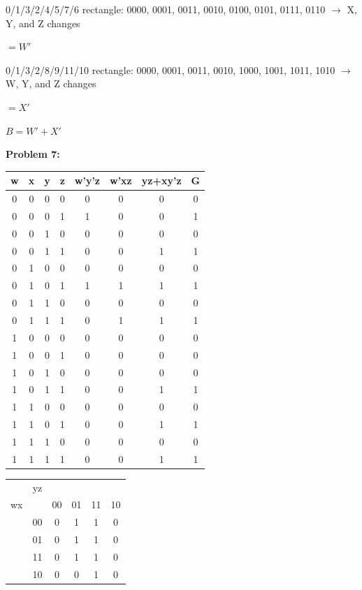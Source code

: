 \documentclass{article}
\begin{document}
    0/1/3/2/4/5/7/6 rectangle: 0000, 0001, 0011, 0010, 0100, 0101, 0111, 0110
    $\rightarrow$ X, Y, and Z changes

    \quad $=W'$

    0/1/3/2/8/9/11/10 rectangle: 0000, 0001, 0011, 0010, 1000, 1001, 1011, 1010
    $\rightarrow$ W, Y, and Z changes

    \quad $=X'$

    $\boxed{B = W'+X'}$


    \textbf{Problem 7:}

    \begin{center}
        \begin{tabular} {ccccccc|c}
            w & x & y & z & w'y'z & w'xz & yz+xy'z & G \\
            \hline
            0 & 0 & 0 & 0 & 0& 0& 0& 0 \\
            0 & 0 & 0 & 1 & 1& 0& 0& 1 \\
            0 & 0 & 1 & 0 & 0& 0& 0& 0 \\
            0 & 0 & 1 & 1 & 0& 0& 1& 1 \\
            0 & 1 & 0 & 0 & 0& 0& 0& 0 \\
            0 & 1 & 0 & 1 & 1& 1& 1& 1 \\
            0 & 1 & 1 & 0 & 0& 0& 0& 0 \\
            0 & 1 & 1 & 1 & 0& 1& 1& 1 \\
            1 & 0 & 0 & 0 & 0& 0& 0& 0 \\
            1 & 0 & 0 & 1 & 0& 0& 0& 0 \\
            1 & 0 & 1 & 0 & 0& 0& 0& 0 \\
            1 & 0 & 1 & 1 & 0& 0& 1& 1 \\
            1 & 1 & 0 & 0 & 0& 0& 0& 0 \\
            1 & 1 & 0 & 1 & 0& 0& 1& 1 \\
            1 & 1 & 1 & 0 & 0& 0& 0& 0 \\
            1 & 1 & 1 & 1 & 0& 0& 1& 1 \\
        \end{tabular}
    \end{center}

    \begin{center}
        \begin{tabular} {cc|cccc}
            & yz & &&& \\
            wx && 00 & 01 & 11 & 10 \\
            \hline
            & 00 & 0 & 1 & 1 & 0 \\
            & 01 & 0 & 1 & 1 & 0 \\
            & 11 & 0 & 1 & 1 & 0 \\
            & 10 & 0 & 0 & 1 & 0 \\
        \end{tabular}
    \end{center}
\end{document}
